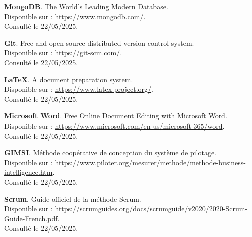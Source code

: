 \documentclass[a4paper,11pt]{report}
\begin{document}
\begin{enumerate}[label=\textbf{[\arabic*]}, leftmargin=1.5cm, itemsep=1.5em]
\item \textbf{MongoDB}. The World's Leading Modern Database. \\
Disponible sur : \url{https://www.mongodb.com/}. \\
Consulté le 22/05/2025.

\item \textbf{Git}. Free and open source distributed version control system. \\
Disponible sur : \url{https://git-scm.com/}. \\
Consulté le 22/05/2025.

\item \textbf{LaTeX}. A document preparation system. \\
Disponible sur : \url{https://www.latex-project.org/}. \\
Consulté le 22/05/2025.

\item \textbf{Microsoft Word}. Free Online Document Editing with Microsoft Word. \\
Disponible sur : \url{https://www.microsoft.com/en-us/microsoft-365/word}. \\
Consulté le 22/05/2025.

\item \textbf{GIMSI}. Méthode coopérative de conception du système de pilotage. \\
Disponible sur : \url{https://www.piloter.org/mesurer/methode/methode-business-intelligence.htm}. \\
Consulté le 22/05/2025.

\item \textbf{Scrum}. Guide officiel de la méthode Scrum. \\
Disponible sur : \url{https://scrumguides.org/docs/scrumguide/v2020/2020-Scrum-Guide-French.pdf}. \\
Consulté le 22/05/2025.

\end{enumerate}
\end{document}
